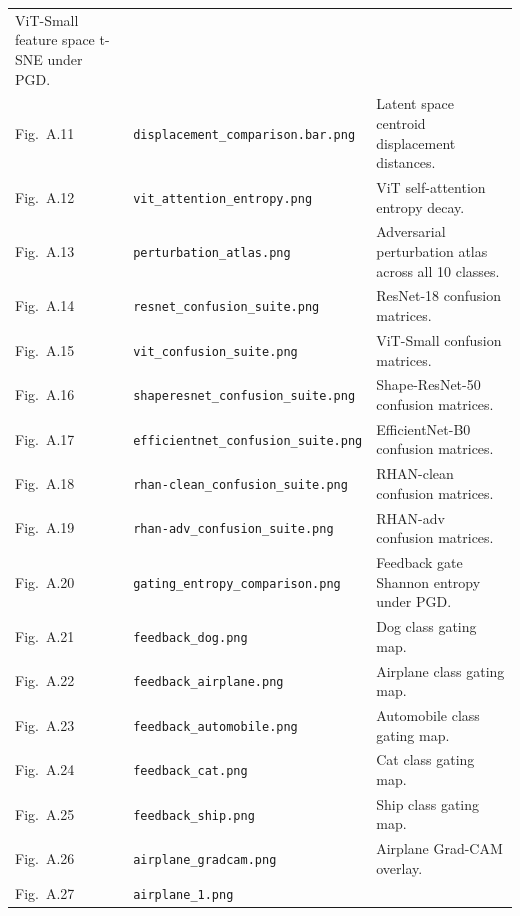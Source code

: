 \documentclass[12pt,a4paper]{article}
\begin{document}
\begin{longtable}{>{\raggedright\arraybackslash}p{2.1cm} >{\raggedright\arraybackslash}p{5.2cm} >{\raggedright\arraybackslash}p{\dimexpr\textwidth-2.1cm-5.2cm-4\tabcolsep\relax}}
ViT-Small feature space t-SNE under PGD. \\
Fig.~A.11 & \texttt{displacement\_\allowbreak{}comparison.bar.png} &
Latent space centroid displacement distances. \\
Fig.~A.12 & \texttt{vit\_\allowbreak{}attention\_\allowbreak{}entropy.png} &
ViT self-attention entropy decay. \\
Fig.~A.13 & \texttt{perturbation\_\allowbreak{}atlas.png} &
Adversarial perturbation atlas across all 10 classes. \\
\midrule
Fig.~A.14 & \texttt{resnet\_\allowbreak{}confusion\_\allowbreak{}suite.png} &
ResNet-18 confusion matrices. \\
Fig.~A.15 & \texttt{vit\_\allowbreak{}confusion\_\allowbreak{}suite.png} &
ViT-Small confusion matrices. \\
Fig.~A.16 & \texttt{shaperesnet\_\allowbreak{}confusion\_\allowbreak{}suite.png} &
Shape-ResNet-50 confusion matrices. \\
Fig.~A.17 & \texttt{efficientnet\_\allowbreak{}confusion\_\allowbreak{}suite.png} &
EfficientNet-B0 confusion matrices. \\
Fig.~A.18 & \texttt{rhan-\allowbreak{}clean\_\allowbreak{}confusion\_\allowbreak{}suite.png} &
RHAN-clean confusion matrices. \\
Fig.~A.19 & \texttt{rhan-\allowbreak{}adv\_\allowbreak{}confusion\_\allowbreak{}suite.png} &
RHAN-adv confusion matrices. \\
\midrule
Fig.~A.20 & \texttt{gating\_\allowbreak{}entropy\_\allowbreak{}comparison.png} &
Feedback gate Shannon entropy under PGD. \\
Fig.~A.21 & \texttt{feedback\_\allowbreak{}dog.png} &
Dog class gating map. \\
Fig.~A.22 & \texttt{feedback\_\allowbreak{}airplane.png} &
Airplane class gating map. \\
Fig.~A.23 & \texttt{feedback\_\allowbreak{}automobile.png} &
Automobile class gating map. \\
Fig.~A.24 & \texttt{feedback\_\allowbreak{}cat.png} &
Cat class gating map. \\
Fig.~A.25 & \texttt{feedback\_\allowbreak{}ship.png} &
Ship class gating map. \\
\midrule
Fig.~A.26 & \texttt{airplane\_\allowbreak{}gradcam.png} &
Airplane Grad-CAM overlay. \\
Fig.~A.27 & \texttt{airplane\_\allowbreak{}1.png} &

\end{longtable}
\end{document}
